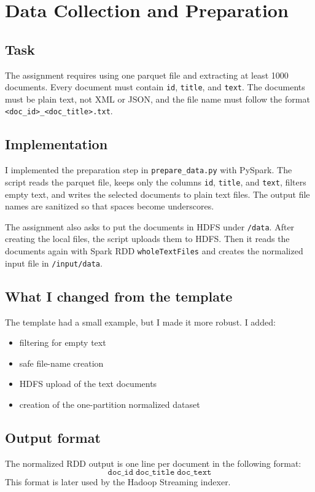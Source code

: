 \documentclass[12pt]{article}
\begin{document}
\section{Data Collection and Preparation}
\subsection{Task}
The assignment requires using one parquet file and extracting at least 1000 documents. Every document must contain \texttt{id}, \texttt{title}, and \texttt{text}. The documents must be plain text, not XML or JSON, and the file name must follow the format \texttt{<doc\_id>\_<doc\_title>.txt}.

\subsection{Implementation}
I implemented the preparation step in \texttt{prepare\_data.py} with PySpark. The script reads the parquet file, keeps only the columns \texttt{id}, \texttt{title}, and \texttt{text}, filters empty text, and writes the selected documents to plain text files. The output file names are sanitized so that spaces become underscores.

The assignment also asks to put the documents in HDFS under \texttt{/data}. After creating the local files, the script uploads them to HDFS. Then it reads the documents again with Spark RDD \texttt{wholeTextFiles} and creates the normalized input file in \texttt{/input/data}.

\subsection{What I changed from the template}
The template had a small example, but I made it more robust. I added:
\begin{itemize}
    \item filtering for empty text
    \item safe file-name creation
    \item HDFS upload of the text documents
    \item creation of the one-partition normalized dataset
\end{itemize}

\subsection{Output format}
The normalized RDD output is one line per document in the following format:
\[
\texttt{doc\_id}\;\texttt{doc\_title}\;\texttt{doc\_text}
\]
This format is later used by the Hadoop Streaming indexer.
\end{document}
